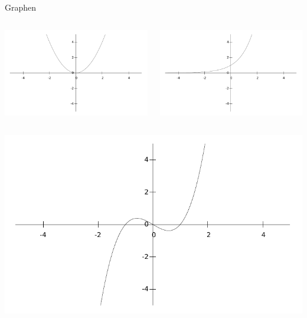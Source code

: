 \documentclass[18pt]{beamer}
\begin{document}
    \begin{frame}{Graphen}
        \begin{columns}
            \begin{column}{.5\textwidth}
                \includegraphics[width=1\textwidth]{graphics/01/01.pdf}
            \end{column}
            \begin{column}{.5\textwidth}
                \includegraphics[width=1\textwidth]{graphics/01/02.pdf}
            \end{column}
        \end{columns}
        \begin{columns}
            \begin{column}{.5\textwidth}
                \includegraphics[width=1.\textwidth]{graphics/01/03.pdf}

\end{column}
\end{columns}
\end{frame}
\end{document}
